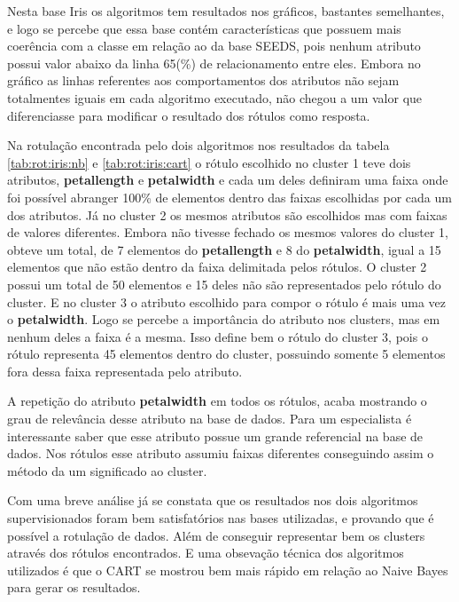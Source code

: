 Nesta base Iris os algoritmos tem resultados nos gráficos, bastantes semelhantes, e logo se percebe que essa base contém características que possuem mais coerência com  a classe em relação ao da base SEEDS, pois nenhum atributo possui valor abaixo da linha 65(\%) de relacionamento entre eles. Embora no gráfico as  linhas referentes aos comportamentos dos atributos não sejam totalmentes iguais em cada algoritmo executado, não chegou a um valor que diferenciasse  para modificar o resultado dos rótulos como resposta.

Na rotulação encontrada pelo dois algoritmos nos resultados da tabela \ref{tab:rot:iris:nb} e \ref{tab:rot:iris:cart} o rótulo escolhido no cluster 1 teve dois atributos, \textbf{petallength} e \textbf{petalwidth} e cada um deles definiram uma faixa onde foi possível abranger 100\% de elementos dentro das faixas escolhidas por cada um dos atributos. Já no cluster 2 os mesmos atributos são escolhidos mas com faixas de valores diferentes. Embora não tivesse fechado os mesmos valores do cluster 1, obteve um total, de 7 elementos do \textbf{petallength} e 8 do \textbf{petalwidth}, igual a 15 elementos que não estão dentro da faixa delimitada pelos rótulos. O cluster 2 possui um total de 50 elementos e 15 deles não são representados pelo rótulo do cluster. E no cluster 3 o atributo escolhido para compor o rótulo é mais uma vez o \textbf{petalwidth}. Logo se percebe a importância do atributo nos clusters, mas em nenhum deles a faixa é a mesma. Isso define bem o rótulo do cluster 3, pois o rótulo representa 45 elementos dentro do cluster, possuindo somente 5 elementos fora dessa faixa representada pelo atributo.

A repetição do atributo \textbf{petalwidth} em todos os rótulos, acaba mostrando o grau de relevância desse atributo na base de dados. Para um especialista é interessante saber que esse atributo possue um grande referencial na base de dados. Nos rótulos esse atributo assumiu faixas diferentes conseguindo assim o método da um significado ao cluster. 

Com uma breve  análise já se constata que os resultados nos dois algoritmos supervisionados foram bem satisfatórios nas bases utilizadas, e  provando que é possível a rotulação de dados. Além de conseguir representar bem os clusters através dos rótulos encontrados. E uma obsevação técnica dos algoritmos utilizados é que o CART se mostrou bem mais rápido em relação ao Naive Bayes para gerar os resultados.






